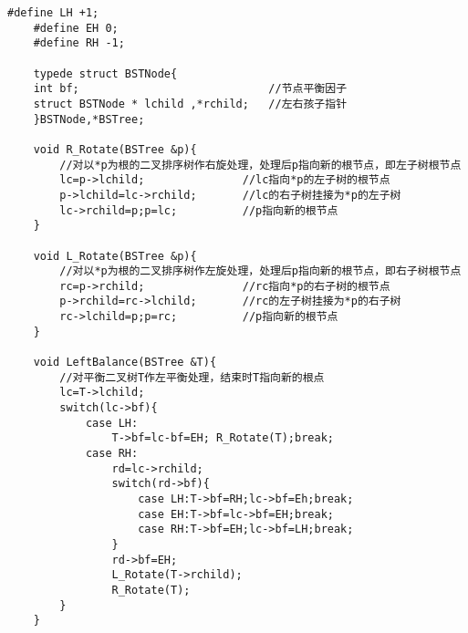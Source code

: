 \documentclass[UTF8]{ctexart}
\begin{document}
\begin{lstlisting}[style=v1]
    #define LH +1;
    #define EH 0;
    #define RH -1;

    typede struct BSTNode{
    int bf;                             //节点平衡因子
    struct BSTNode * lchild ,*rchild;   //左右孩子指针
    }BSTNode,*BSTree;

    void R_Rotate(BSTree &p){
        //对以*p为根的二叉排序树作右旋处理，处理后p指向新的根节点，即左子树根节点
        lc=p->lchild;               //lc指向*p的左子树的根节点
        p->lchild=lc->rchild;       //lc的右子树挂接为*p的左子树    
        lc->rchild=p;p=lc;          //p指向新的根节点
    }

    void L_Rotate(BSTree &p){
        //对以*p为根的二叉排序树作左旋处理，处理后p指向新的根节点，即右子树根节点
        rc=p->rchild;               //rc指向*p的右子树的根节点
        p->rchild=rc->lchild;       //rc的左子树挂接为*p的右子树    
        rc->lchild=p;p=rc;          //p指向新的根节点
    }

    void LeftBalance(BSTree &T){
        //对平衡二叉树T作左平衡处理，结束时T指向新的根点
        lc=T->lchild;
        switch(lc->bf){
            case LH:
                T->bf=lc-bf=EH; R_Rotate(T);break;
            case RH:
                rd=lc->rchild;
                switch(rd->bf){
                    case LH:T->bf=RH;lc->bf=Eh;break;
                    case EH:T->bf=lc->bf=EH;break;
                    case RH:T->bf=EH;lc->bf=LH;break;
                }
                rd->bf=EH;
                L_Rotate(T->rchild);
                R_Rotate(T);
        }
    }



\end{lstlisting}

\newpage
\end{document}
